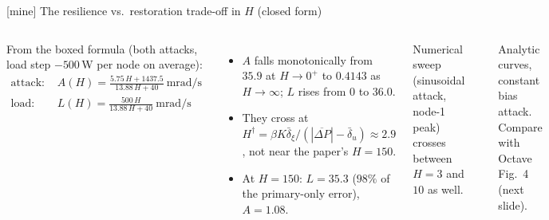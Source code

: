 \documentclass[aspectratio=169,9pt]{beamer}
\begin{document}
\begin{frame}[t]{[mine] The resilience vs.\ restoration trade-off in $H$ (closed form)}
\footnotesize
\begin{columns}[T]
From the boxed formula (both attacks, load step $-500$\,W per node on average):
\begin{align*}
\text{attack: }&A(H)=\frac{5.75\,H+1437.5}{13.88\,H+40}\ \text{mrad/s}\\
\text{load: }&L(H)=\frac{500\,H}{13.88\,H+40}\ \text{mrad/s}
\end{align*}
\begin{itemize}
\item $A$ falls monotonically from $35.9$ at $H\to0^+$ to $0.4143$ as $H\to\infty$; $L$ rises from $0$ to $36.0$.
\item They cross at $H^\dagger=\beta K\bar\delta_\xi/(|\overline{\Delta P}|-\bar\delta_u)\approx2.9$, not near the paper's $H=150$.
\item At $H=150$: $L=35.3$ ($98\%$ of the primary-only error), $A=1.08$.
\end{itemize}
\vspace{0.1cm}
{\scriptsize Numerical sweep (sinusoidal attack, node-1 peak) crosses between $H=3$ and $10$ as well.}
\begin{center}
\end{center}
{\scriptsize Analytic curves, constant bias attack. Compare with Octave Fig.~4 (next slide).}
\end{columns}
\end{frame}
\end{document}
